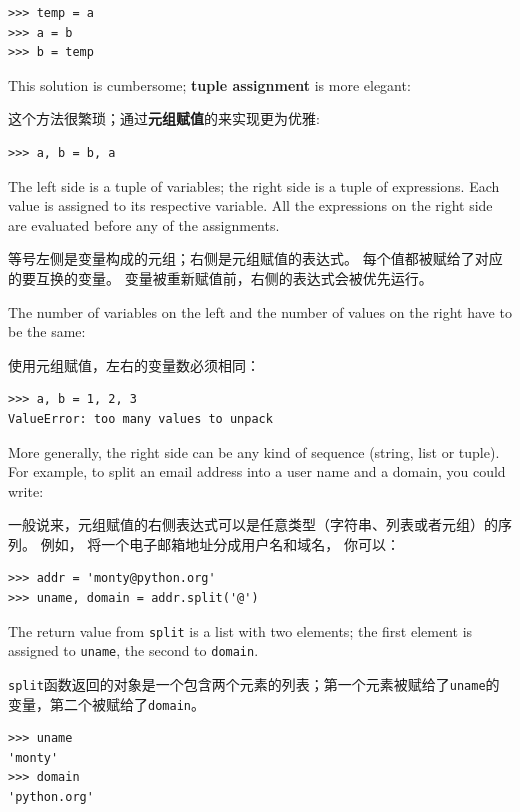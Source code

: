 \begin{lstlisting}
>>> temp = a
>>> a = b
>>> b = temp
\end{lstlisting}
%
This solution is cumbersome; {\bf tuple assignment} is more elegant:

这个方法很繁琐；通过{\bf 元组赋值}的来实现更为优雅:

\begin{lstlisting}
>>> a, b = b, a
\end{lstlisting}
%
The left side is a tuple of variables; the right side is a tuple of
expressions.  Each value is assigned to its respective variable.
All the expressions on the right side are evaluated before any
of the assignments.

等号左侧是变量构成的元组；右侧是元组赋值的表达式。  每个值都被赋给了对应的要互换的变量。  变量被重新赋值前，右侧的表达式会被优先运行。

The number of variables on the left and the number of
values on the right have to be the same:

使用元组赋值，左右的变量数必须相同：


\begin{lstlisting}
>>> a, b = 1, 2, 3
ValueError: too many values to unpack
\end{lstlisting}
%
More generally, the right side can be any kind of sequence
(string, list or tuple).  For example, to split an email address
into a user name and a domain, you could write:

一般说来，元组赋值的右侧表达式可以是任意类型（字符串、列表或者元组）的序列。 例如， 将一个电子邮箱地址分成用户名和域名， 你可以：


\begin{lstlisting}
>>> addr = 'monty@python.org'
>>> uname, domain = addr.split('@')
\end{lstlisting}
%
The return value from {\tt split} is a list with two elements;
the first element is assigned to {\tt uname}, the second to
{\tt domain}.

\lstinline{split}函数返回的对象是一个包含两个元素的列表；第一个元素被赋给了\lstinline{uname}的变量，第二个被赋给了\lstinline{domain}。

\begin{lstlisting}
>>> uname
'monty'
>>> domain
'python.org'
\end{lstlisting}
%

